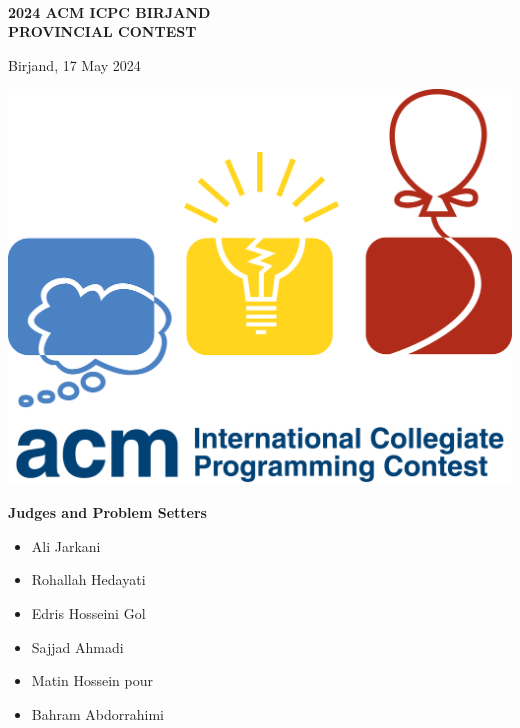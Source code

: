 
\begin{center}
	\huge
	
	\textbf{\sffamily ~\\2024 ACM ICPC BIRJAND\\PROVINCIAL CONTEST}
	
	\bigskip
	
	\textsf{Birjand, 17 May 2024}
	
	\bigskip\bigskip\bigskip
	
	\includegraphics[width=.5\linewidth]{icpc-logo.png}
	
	\bigskip\normalsize
	\vspace{1cm}
	\Large
	\textbf{Judges and Problem Setters}
	
	\vspace{0.5cm}
	\normalsize
	\noindent\begin{minipage}{.5\linewidth}
		\begin{itemize}
			\item Ali Jarkani
			\item Rohallah Hedayati
			\item Edris Hosseini Gol
		\end{itemize}
	\end{minipage}%
	\begin{minipage}{.5\linewidth}
		\begin{itemize}
			\item Sajjad Ahmadi
			\item Matin Hossein pour
			\item Bahram Abdorrahimi			
		\end{itemize}
	\end{minipage}
	
\end{center}
